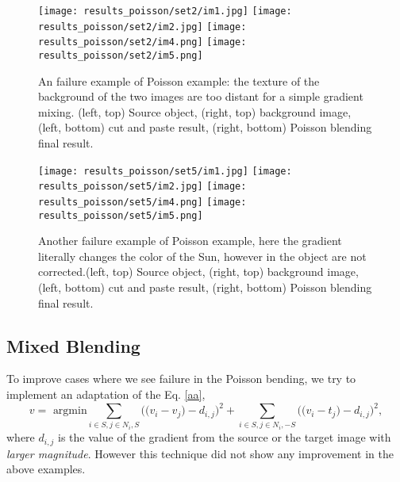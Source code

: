 \documentclass[11pt]{article}
\begin{document}
\quad


\begin{figure} [ht]
\begin{center}
\texttt{[image: results\_poisson/set2/im1.jpg]}  
\texttt{[image: results\_poisson/set2/im2.jpg]}
\texttt{[image: results\_poisson/set2/im4.png]} 
\texttt{[image: results\_poisson/set2/im5.png]}   
\caption{An failure example of Poisson example: the texture of the background of the two images are too distant for a simple gradient mixing. (left, top) Source object, (right, top) background image,   (left, bottom) cut and paste result, (right, bottom) Poisson blending final result.}
\label{3}
\end{center}
\end{figure}

\quad






\begin{figure} [ht]
\begin{center}
\texttt{[image: results\_poisson/set5/im1.jpg]}  
\texttt{[image: results\_poisson/set5/im2.jpg]}
\texttt{[image: results\_poisson/set5/im4.png]} 
\texttt{[image: results\_poisson/set5/im5.png]}   
\caption{Another failure  example of Poisson example, here the gradient literally changes the color of the Sun, however in the object are not corrected.(left, top) Source object, (right, top) background image,   (left, bottom) cut and paste result, (right, bottom) Poisson blending final result.}
\label{4}
\end{center}
\end{figure}

\quad




\subsection*{Mixed Blending}
To improve cases where we see failure in the Poisson bending,  we try to implement an adaptation of the Eq. \ref{aa},
\begin{equation}
v = \mbox{ argmin} \sum_{i \in S, j \in N_i, S} \Bigg ( \Big ( v_i -v_j\Big) - d_{i,j} \Bigg)^2 +  \sum_{i \in S, j \in N_i, -S} \Bigg ( \Big ( v_i -t_j\Big) - d_{i,j} \Bigg)^2,
\end{equation}
where $d_{i,j}$ is the value of the gradient from the source or the target image with {\it larger magnitude}. However this technique  did not show any improvement in the above examples.
\end{document}
